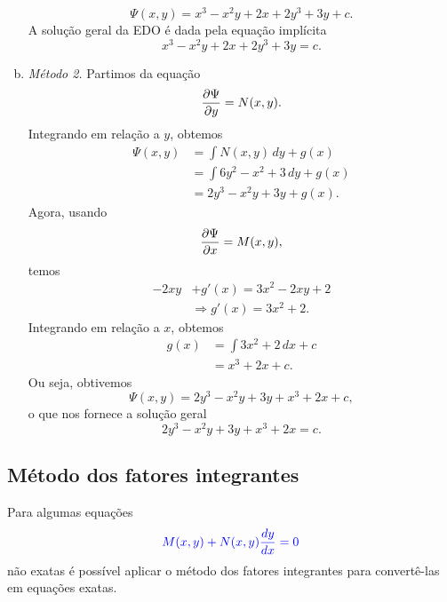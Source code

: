 \begin{ex}
\begin{enumerate}[a)]
\begin{equation}
      \Psi(x,y) = x^3 - x^2y + 2x + 2y^3 + 3y + c.
    \end{equation}
    A solução geral da EDO é dada pela equação implícita
    \begin{equation}
      x^3 - x^2y + 2x + 2y^3 + 3y = c.
    \end{equation}
  \item \emph{Método 2.}
    Partimos da equação
    \begin{equation}
      \frac{\partial\Psi}{\partial y} = N(x,y).
    \end{equation}
    Integrando em relação a $y$, obtemos
    \begin{align}
      \Psi(x,y) &= \int N(x,y)\,dy + g(x)\\
                &= \int 6y^2 - x^2 + 3\,dy + g(x) \\
                &= 2y^3 - x^2y + 3y + g(x).
    \end{align}
    Agora, usando
    \begin{equation}
      \frac{\partial\Psi}{\partial x} = M(x,y),
    \end{equation}
    temos
    \begin{align}
      -2xy &+ g'(x) = 3x^2 - 2xy + 2 \\
           &\Rightarrow g'(x) = 3x^2 + 2.
    \end{align}
    Integrando em relação a $x$, obtemos
    \begin{align}
      g(x) &= \int 3x^2 + 2\,dx + c \\
           &= x^3 + 2x + c.
    \end{align}
    Ou seja, obtivemos
    \begin{equation}
      \Psi(x,y) = 2y^3 - x^2y + 3y + x^3 + 2x + c,
    \end{equation}
    o que nos fornece a solução geral
    \begin{equation}
      2y^3 - x^2y + 3y + x^3 + 2x = c.
    \end{equation}
  \end{enumerate}
\end{ex}

\subsection{Método dos fatores integrantes}

Para algumas equações
\begin{equation}\label{eq:eqnexata}
  {\color{blue}M(x,y) + N(x,y)\frac{dy}{dx} = 0}
\end{equation}
não exatas é possível aplicar o método dos fatores integrantes para convertê-las em equações exatas.

